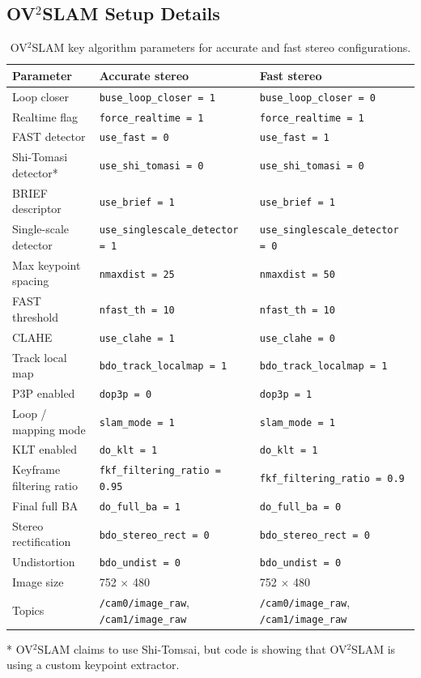 \documentclass[11pt]{article}
\begin{document}
\subsection{OV$^{2}$SLAM Setup Details}

\begin{table}[H]
\centering
\small
\caption{OV$^{2}$SLAM key algorithm parameters for accurate and fast stereo configurations.}
\label{tab:ov2_algorithm_params}
\begin{tabular}{lp{4.6cm}p{4.6cm}}
\toprule
Parameter & Accurate stereo & Fast stereo \\
\midrule
Loop closer & \texttt{buse\_loop\_closer = 1} & \texttt{buse\_loop\_closer = 0} \\
Realtime flag & \texttt{force\_realtime = 1} & \texttt{force\_realtime = 1} \\
FAST detector & \texttt{use\_fast = 0} & \texttt{use\_fast = 1} \\
Shi-Tomasi detector* & \texttt{use\_shi\_tomasi = 0} & \texttt{use\_shi\_tomasi = 0} \\
BRIEF descriptor & \texttt{use\_brief = 1} & \texttt{use\_brief = 1} \\
Single-scale detector & \texttt{use\_singlescale\_detector = 1} & \texttt{use\_singlescale\_detector = 0} \\
Max keypoint spacing & \texttt{nmaxdist = 25} & \texttt{nmaxdist = 50} \\
FAST threshold & \texttt{nfast\_th = 10} & \texttt{nfast\_th = 10} \\
CLAHE & \texttt{use\_clahe = 1} & \texttt{use\_clahe = 0} \\
Track local map & \texttt{bdo\_track\_localmap = 1} & \texttt{bdo\_track\_localmap = 1} \\
P3P enabled & \texttt{dop3p = 0} & \texttt{dop3p = 1} \\
Loop / mapping mode & \texttt{slam\_mode = 1} & \texttt{slam\_mode = 1} \\
KLT enabled & \texttt{do\_klt = 1} & \texttt{do\_klt = 1} \\
Keyframe filtering ratio & \texttt{fkf\_filtering\_ratio = 0.95} & \texttt{fkf\_filtering\_ratio = 0.9} \\
Final full BA & \texttt{do\_full\_ba = 1} & \texttt{do\_full\_ba = 0} \\
Stereo rectification & \texttt{bdo\_stereo\_rect = 0} & \texttt{bdo\_stereo\_rect = 0} \\
Undistortion & \texttt{bdo\_undist = 0} & \texttt{bdo\_undist = 0} \\
Image size & 752 $\times$ 480 & 752 $\times$ 480 \\
Topics & \texttt{/cam0/image\_raw}, \texttt{/cam1/image\_raw} & \texttt{/cam0/image\_raw}, \texttt{/cam1/image\_raw} \\
\bottomrule
\end{tabular}
\end{table}
* OV$^{2}$SLAM claims to use Shi-Tomsai, but code is showing that OV$^{2}$SLAM is using a custom keypoint extractor.
\end{document}
